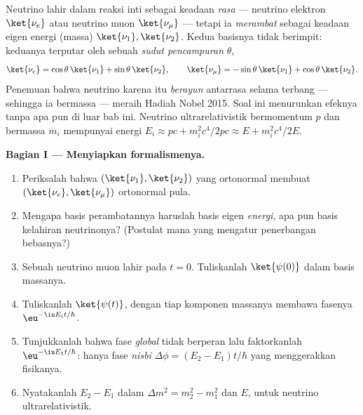 \begin{problem}\label{pb:b3:quantum-formalism:1}
Neutrino lahir dalam reaksi inti sebagai keadaan \emph{rasa} ---
neutrino elektron $\ket{\nu_e}$ atau neutrino muon $\ket{\nu_\mu}$ ---
tetapi ia \emph{merambat} sebagai keadaan eigen energi (massa) $\ket{\nu_1},
\ket{\nu_2}$. Kedua basisnya tidak berimpit: keduanya terputar oleh
sebuah \emph{sudut pencampuran} $\theta$,
\[
\ket{\nu_e} = \cos\theta\,\ket{\nu_1} + \sin\theta\,\ket{\nu_2} ,
\qquad
\ket{\nu_\mu} = -\sin\theta\,\ket{\nu_1} + \cos\theta\,\ket{\nu_2} .
\]
Penemuan bahwa neutrino karena itu \emph{berayun} antarrasa selama
terbang --- sehingga ia bermassa --- meraih Hadiah Nobel 2015. Soal ini
menurunkan efeknya tanpa apa pun di luar bab ini. Neutrino
ultrarelativistik bermomentum $p$ dan bermassa
$m_i$ mempunyai energi $E_i \approx pc + m_i^2c^4/2pc \approx E +
m_i^2c^4/2E$.

\medskip\noindent\textbf{Bagian I --- Menyiapkan formalismenya.}
\begin{enumerate}
  \item Periksalah bahwa $(\ket{\nu_1}, \ket{\nu_2})$ yang ortonormal
        membuat $(\ket{\nu_e}, \ket{\nu_\mu})$ ortonormal pula.
  \item Mengapa basis perambatannya haruslah basis eigen \emph{energi},
        apa pun basis kelahiran neutrinonya? (Postulat mana yang
        mengatur penerbangan bebasnya?)
  \item Sebuah neutrino muon lahir pada $t = 0$. Tuliskanlah
        $\ket{\psi(0)}$ dalam basis massanya.
  \item Tuliskanlah $\ket{\psi(t)}$, dengan tiap komponen massanya
        membawa fasenya $\eu^{-\iu E_it/\hbar}$.
  \item Tunjukkanlah bahwa fase \emph{global} tidak berperan lalu
        faktorkanlah $\eu^{-\iu E_1t/\hbar}$: hanya fase \emph{nisbi}
        $\Delta\phi = (E_2 - E_1)t/\hbar$ yang menggerakkan fisikanya.
  \item Nyatakanlah $E_2 - E_1$ dalam $\Delta m^2 = m_2^2 - m_1^2$
        dan $E$, untuk neutrino ultrarelativistik.
\end{enumerate}


\end{problem}
